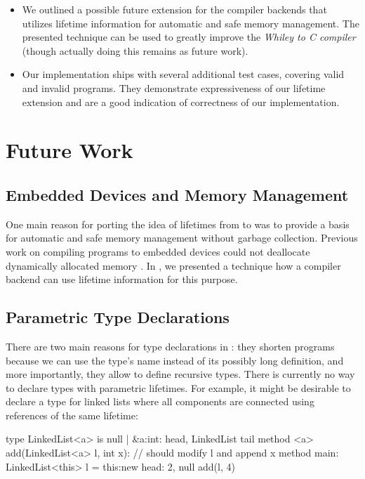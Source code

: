 \begin{itemize}
\item We outlined a possible future extension for the \whiley compiler backends that utilizes lifetime information for automatic and safe memory management.
The presented technique can be used to greatly improve the \emph{Whiley to C compiler} (though actually doing this remains as future work).

\item Our implementation ships with several additional test cases, covering valid and invalid programs.
They demonstrate expressiveness of our lifetime extension and are a good indication of correctness of our implementation.
\end{itemize}


\section{Future Work}
\subsection*{Embedded Devices and Memory Management}
One main reason for porting the idea of lifetimes from \rust to \whiley was to provide a basis for automatic and safe memory management without garbage collection.
Previous work on compiling \whiley programs to embedded devices could not deallocate dynamically allocated memory \cite{Matt}.
In , we presented a technique how a \whiley compiler backend can use lifetime information for this purpose.


\subsection*{Parametric Type Declarations}
There are two main reasons for type declarations in \whiley:
they shorten programs because we can use the type's name instead of its possibly long definition, and more importantly, they allow to define recursive types.
There is currently no way to declare types with parametric lifetimes.
For example, it might be desirable to declare a type for linked lists where all components are connected using references of the same lifetime:

\begin{whileycode}
type LinkedList<a> is null | &a:{int: head, LinkedList tail}
method <a> add(LinkedList<a> l, int x):
	// should modify l and append x
method main:
	LinkedList<this> l = this:new {head: 2, null}
	add(l, 4)
\end{whileycode}

